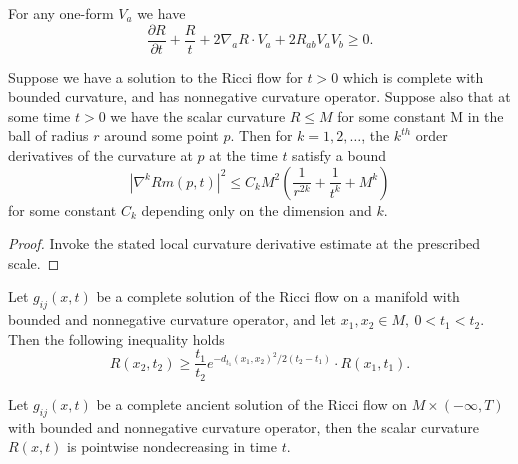 \begin{corollary}
  \label{cor:cz-trace-liyauhamilton-estimate}
For any one-form $V_a$ we have
$$
\frac{\partial R}{\partial t}+\frac{R}{t} +2\nabla_aR\cdot
V_a+2R_{ab}V_aV_b\geq 0.
$$
\end{corollary}

\begin{corollary}
  \label{cor:cz-rigidity-in-the-trace-harnack-estimate}
Suppose we have a solution to the Ricci flow for $t>0$ which is
complete with bounded curvature, and has nonnegative curvature
operator. Suppose also that at some time $t>0$ we have the scalar
curvature $R\leq M$ for some constant M in the ball of radius $r$
around some point $p$. Then for $k=1,2,\ldots$, the $k^{th}$ order
derivatives of the curvature at $p$ at the time $t$ satisfy a
bound
$$
|\nabla^k Rm(p,t)|^2\leq
C_kM^2\left(\frac{1}{r^{2k}}+\frac{1}{t^k}+M^k\right)
$$
for some constant $C_k$ depending only on the dimension and $k$.
\end{corollary}

\begin{proof}
  \sketch Invoke the stated local curvature derivative estimate at the prescribed scale.
\end{proof}

\begin{corollary}
  \label{cor:cz-integrated-scalar-curvature-harnack-estimate}
Let $g_{ij}(x,t)$ be a complete solution of the Ricci flow on a
manifold with bounded and nonnegative curvature operator, and let
$x_1,x_2\in M,\ 0<t_1<t_2.$ Then the following inequality holds
$$
R(x_2,t_2)\geq\frac{t_1}{t_2}e^{-d_{t_1}(x_1,x_2)^2/2(t_2-t_1)}\cdot
R(x_1,t_1).$$
\end{corollary}

\begin{corollary}
  \label{cor:cz-scalar-curvature-monotonicity-for-ancient-solutions}
Let $g_{ij}(x,t)$ be a complete ancient solution of the Ricci flow
on $M\times (-\infty, T)$ with bounded and nonnegative curvature
operator, then the scalar curvature $R(x,t)$ is pointwise
nondecreasing in time $t$.
\end{corollary}

